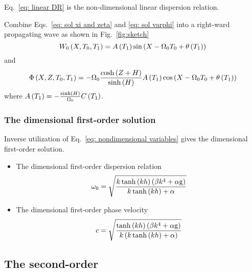 Eq.~\eqref{eq: linear DR} is the non-dimensional linear dispersion relation.

Combine Eqs.~\eqref{eq: sol xi and zeta} and \eqref{eq: sol varphi} into a right-ward propagating wave as shown in Fig.~\ref{fig:sketch} 
\begin{equation}
    W_0 \left( X,T_{0},T_{1} \right) 
    = 
    A \left(T_1\right)
    \sin\left( X
    - \Omega_0 T_0 
    + \theta\left(T_1\right) \right)
    \label{eq: sol W0}
\end{equation}
and
\begin{equation}
    \Phi\left(X,Z,T_0,T_1\right) 
    = 
    - \Omega_0
    \frac{ \cosh\left(Z+H\right) }{ \sinh\left(H\right) } 
    A\left(T_1\right) 
    \cos \left( 
    X
    - \Omega_0 T_0 
    + \theta\left(T_1\right)
    \right)
    \label{eq: sol Phi}
\end{equation}
where \ensuremath{A\bkt{T_1}=- \frac{\sinh\bkt{H}}{\Omega_0}  C\bkt{T_1}}.

\subsubsection{The dimensional first-order solution}
Inverse utilization of Eq.~\eqref{eq: nondimensional variables} gives the dimensional first-order solution.
\begin{itemize}
    \item The dimensional first-order dispersion relation
    \begin{equation}
        \omega_0 =  \sqrt{ \frac{ k \tanh\left(kh\right) \left(\beta k^4 + \alpha \mathrm{g} \right) }{ k \tanh\left(kh\right) + \alpha } }
        \label{eq: linear dr}
    \end{equation}
    
    \item The dimensional first-order phase velocity
\begin{equation}
    c = \sqrt{ \frac{ \tanh\left(kh\right) \left(\beta k^4 + \alpha \mathrm{g} \right) }{ k \left( k \tanh\left(kh\right) + \alpha \right) } }
\end{equation}
\end{itemize}


\subsection{The second-order}

